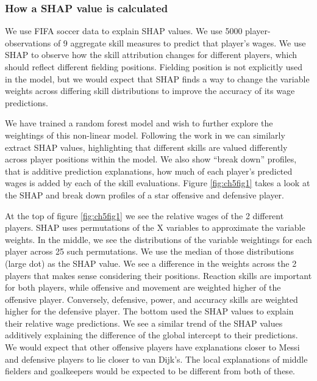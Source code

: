 \documentclass{template/monashthesis}
\begin{document}
\hypertarget{how-a-shap-value-is-calculated}{%
\subsubsection{How a SHAP value is calculated}\label{how-a-shap-value-is-calculated}}

We use FIFA soccer data \autocite{leone_fifa_2020} to explain SHAP values. We use 5000 player-observations of 9 aggregate skill measures to predict that player's wages. We use SHAP to observe how the skill attribution changes for different players, which should reflect different fielding positions. Fielding position is not explicitly used in the model, but we would expect that SHAP finds a way to change the variable weights across differing skill distributions to improve the accuracy of its wage predictions.

We have trained a random forest model and wish to further explore the weightings of this non-linear model. Following the work in \autocite{biecek_dalex_2018,biecek_explanatory_2021} we can similarly extract SHAP values, highlighting that different skills are valued differently across player positions within the model. We also show ``break down'' profiles, that is additive prediction explanations, how much of each player's predicted wages is added by each of the skill evaluations. Figure \ref{fig:ch5fig1} takes a look at the SHAP and break down profiles of a star offensive and defensive player.

At the top of figure \ref{fig:ch5fig1} we see the relative wages of the 2 different players. SHAP uses permutations of the X variables to approximate the variable weights. In the middle, we see the distributions of the variable weightings for each player across 25 such permutations. We use the median of those distributions (large dot) as the SHAP value. We see a difference in the weights across the 2 players that makes sense considering their positions. Reaction skills are important for both players, while offensive and movement are weighted higher of the offensive player. Conversely, defensive, power, and accuracy skills are weighted higher for the defensive player. The bottom used the SHAP values to explain their relative wage predictions. We see a similar trend of the SHAP values additively explaining the difference of the global intercept to their predictions. We would expect that other offensive players have explanations closer to Messi and defensive players to lie closer to van Dijk's. The local explanations of middle fielders and goalkeepers would be expected to be different from both of these.
\end{document}
